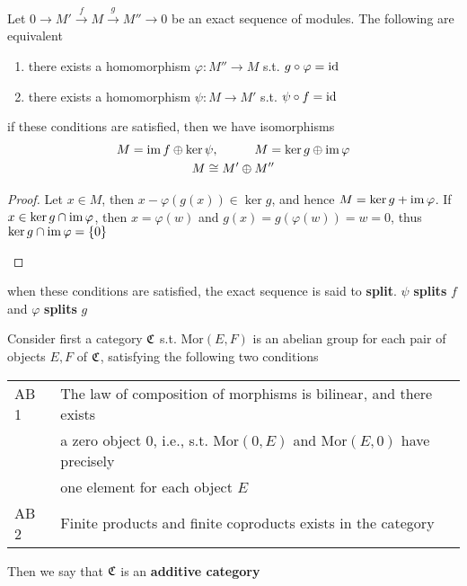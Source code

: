 \documentclass[11pt]{article}
\def \Mor {\text{Mor}}
\begin{document}
\begin{proposition}[]
Let \(0\to M'\xrightarrow{f}M\xrightarrow{g}M''\to 0\) be an exact sequence of modules. The following are equivalent
\begin{enumerate}
\item there exists a homomorphism \(\varphi:M''\to M\) s.t. \(g\circ\varphi=\operatorname{id}\)
\item there exists a homomorphism \(\psi:M\to M'\) s.t. \(\psi\circ f=\operatorname{id}\)
\end{enumerate}


if these conditions are satisfied, then we have isomorphisms
\begin{gather*}
M=\operatorname{im} f\oplus\ker\psi,\hspace{1cm}M=\ker g\oplus\operatorname{im}\varphi\\
M\cong M'\oplus M''
\end{gather*}
\end{proposition}

\begin{proof}
Let \(x\in M\), then \(x-\varphi(g(x))\in\ker g\), and hence \(M=\ker g+\operatorname{im}\varphi\). If \(x\in\ker g\cap\operatorname{im}\varphi\),
then \(x=\varphi(w)\) and \(g(x)=g(\varphi(w))=w=0\), thus \(\ker g\cap\operatorname{im}\varphi=\{0\}\)

\label{Problem3}
\end{proof}

when these conditions are satisfied, the exact sequence is said to \textbf{split}. \(\psi\) \textbf{splits} \(f\) and
\(\varphi\) \textbf{splits} \(g\)

Consider first a category \(\mathfrak{C}\) s.t. \(\Mor(E,F)\) is an abelian group for each pair of
objects \(E,F\) of \(\mathfrak{C}\), satisfying the following two conditions
\begin{center}
\begin{tabular}{ll}
AB 1 & The law of composition of morphisms is bilinear, and there exists\\
 & a zero object 0, i.e., s.t. \(\Mor(0,E)\) and \(\Mor(E,0)\) have precisely\\
 & one element for each object \(E\)\\
AB 2 & Finite products and finite coproducts exists in the category\\
\end{tabular}
\end{center}

Then we say that \(\mathfrak{C}\) is an \textbf{additive category}
\end{document}
